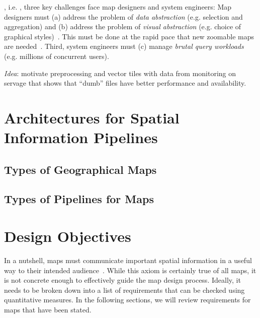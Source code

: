 \documentclass[11pt, oneside]{report}   	%
\begin{document}

, i.e. , three key challenges face map designers and system engineers: Map designers must (a) address the problem of \emph{data abstraction} (e.g. selection and aggregation) and (b) address the problem of  \emph{visual abstraction} (e.g. choice of graphical styles)~\cite{stolte2003multiscale}. This must be done at the rapid pace that new zoomable maps are needed~\cite{lomet2012warstories}. Third, system engineers must (c) manage \emph{brutal query workloads} (e.g. millions of concurrent users).

\emph{Idea}: motivate preprocessing and vector tiles with data from monitoring on servage that shows that ``dumb'' files have better performance and availability.

\section{Architectures for Spatial Information Pipelines}

\subsection{Types of Geographical Maps}

\subsection{Types of Pipelines for Maps}

\section{Design Objectives}
In a nutshell, maps must communicate important spatial information in a useful way to their intended audience~\cite{robinson1982early}. While this axiom is certainly true of all maps, it is not concrete enough to effectively guide the map design process. Ideally, it needs to be broken down into a list of requirements that can be checked using quantitative measures. In the following sections, we will review requirements for maps that have been stated.
\end{document}

